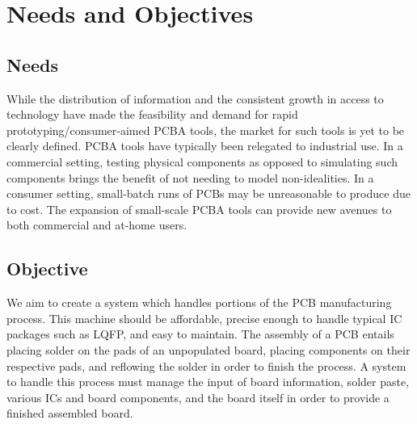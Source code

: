 \section{Needs and Objectives}

\subsection{Needs} 
	While the distribution of information and the consistent growth in access to technology have made the feasibility and demand for rapid prototyping/consumer-aimed PCBA tools, the market for such tools is yet to be clearly defined. PCBA tools have typically been relegated to industrial use. In a commercial setting, testing physical components as opposed to simulating such components brings the benefit of not needing to model non-idealities. In a consumer setting, small-batch runs of PCBs may be unreasonable to produce due to cost. The expansion of small-scale PCBA tools can provide new avenues to both commercial and at-home users. 

\subsection{Objective}
	We aim to create a system which handles portions of the PCB manufacturing process. This machine should be affordable, precise enough to handle typical IC packages such as LQFP, and easy to maintain. The assembly of a PCB entails placing solder on the pads of an unpopulated board, placing components on their respective pads, and reflowing the solder in order to finish the process. A system to handle this process must manage the input of board information, solder paste, various ICs and board components, and the board itself in order to provide a finished assembled board. 
